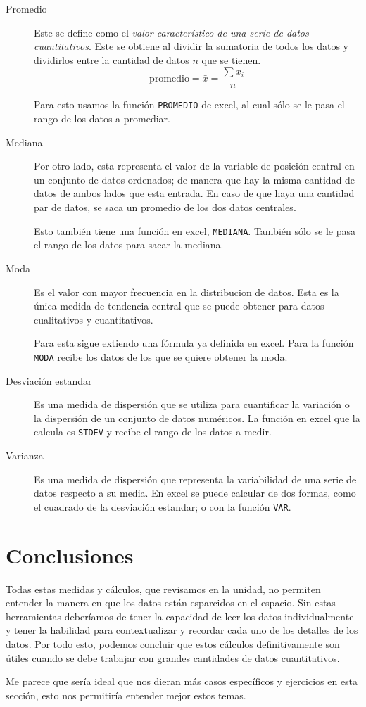 \documentclass[12pt]{article}
\begin{document}
	\begin{description}
		\item [Promedio] Este se define como el \textit{valor característico de una serie de datos cuantitativos}. Este se obtiene al dividir la sumatoria de todos los datos y dividirlos entre la cantidad de datos $n$ que se tienen.
			$$ \text{promedio} = \bar x = \frac{\sum x_i}{n}$$
			
			Para esto usamos la función \texttt{PROMEDIO} de excel, al cual sólo se le pasa el rango de los datos a promediar.
			
		\item [Mediana] Por otro lado, esta representa el valor de la variable de posición central en un conjunto de datos ordenados; de manera que hay la misma cantidad de datos de ambos lados que esta entrada. En caso de que haya una cantidad par de datos, se saca un promedio de los dos datos centrales.
			
			Esto también tiene una función en excel, \texttt{MEDIANA}. También sólo se le pasa el rango de los datos para sacar la mediana.
		
		\item [Moda] Es el valor con mayor frecuencia en la distribucion de datos. Esta es la única medida de tendencia central que se puede obtener para datos cualitativos y cuantitativos.
		
			Para esta sigue extiendo una fórmula ya definida en excel. Para la función \texttt{MODA} recibe los datos de los que se quiere obtener la moda.
		
		\item [Desviación estandar] Es una medida de dispersión que se utiliza para cuantificar la variación o la dispersión de un conjunto de datos numéricos. La función en excel que la calcula es \texttt{STDEV} y recibe el rango de los datos a medir.
		
		\item [Varianza] Es una medida de dispersión que representa la variabilidad de una serie de datos respecto a su media. En excel se puede calcular de dos formas, como el cuadrado de la desviación estandar; o con la función \texttt{VAR}.
	\end{description}




\section{Conclusiones}

	\par Todas estas medidas y cálculos, que revisamos en la unidad, no permiten entender la manera en que los datos están esparcidos en el espacio. Sin estas herramientas deberíamos de tener la capacidad de leer los datos individualmente y tener la habilidad para contextualizar y recordar cada uno de los detalles de los datos. Por todo esto, podemos concluir que estos cálculos definitivamente son útiles cuando se debe trabajar con grandes cantidades de datos cuantitativos.
	\par Me parece que sería ideal que nos dieran más casos específicos y ejercicios en esta sección, esto nos permitiría entender mejor estos temas.
\end{document}
